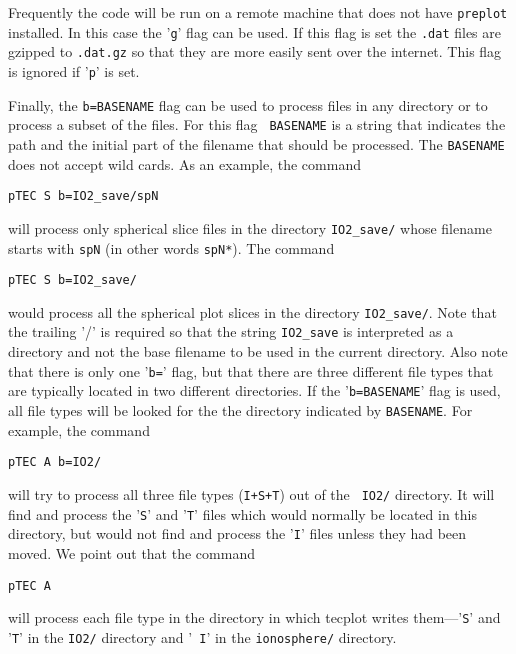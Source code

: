 Frequently the code will be run on a remote machine that does not
have {\tt preplot} installed.  In this case the '{\tt g}' flag
can be used.  If this flag is set the {\tt .dat} files are gzipped
to {\tt .dat.gz} so that they are more easily sent over the internet.
This flag is ignored if '{\tt p}' is set.

Finally, the {\tt b=BASENAME} flag can be used to process files in any
directory or to process a subset of the files.  For this flag {\tt
BASENAME} is a string that indicates the path and the initial part of the
filename that should be processed.  The {\tt BASENAME} does not accept
wild cards.  As an example, the command
\begin{verbatim}
pTEC S b=IO2_save/spN
\end{verbatim}
will process only spherical slice files in the directory {\tt IO2\_save/}
whose filename starts with {\tt spN} (in other words {\tt spN*}).
The command 
\begin{verbatim}
pTEC S b=IO2_save/
\end{verbatim}
would process all the spherical plot slices in the directory {\tt IO2\_save/}.
Note that the trailing '/' is required so that the string {\tt IO2\_save}
is interpreted as a directory and not the base filename to be used
in the current directory.  Also note that there is only one '{\tt b=}' flag,
but that there are three different file types that are typically located
in two different directories.  If the  '{\tt b=BASENAME}' flag is used, all
file types will be looked for the the directory indicated by {\tt BASENAME}.
For example, the command 
\begin{verbatim}
pTEC A b=IO2/
\end{verbatim}
will try to process all three file types ({\tt I+S+T}) out of the {\tt
IO2/} directory.  It will find and process the '{\tt S}' and '{\tt T}'
files which would normally be located in this directory, but would not
find and process the '{\tt I}' files unless they had been moved.  We
point out that the command
\begin{verbatim}
pTEC A 
\end{verbatim}
will process each file type in the directory in which tecplot writes
them---'{\tt S}' and '{\tt T}' in the {\tt IO2/} directory and '{\tt
I}' in the {\tt ionosphere/} directory.  

